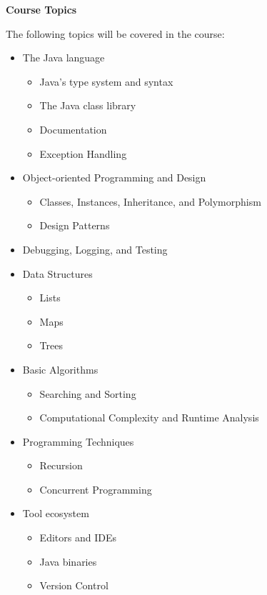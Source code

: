 \documentclass[12pt]{article}
\begin{document}
\pagebreak
{\large \noindent \textbf{Course Topics} }

\noindent The following topics will be covered in the course:

\begin{itemize}
\item The Java language
  \begin{itemize}
  \item Java's type system and syntax
  \item The Java class library
  \item Documentation
  \item Exception Handling
  \end{itemize}
\item Object-oriented Programming and Design
  \begin{itemize}
  \item Classes, Instances, Inheritance, and Polymorphism
  \item Design Patterns
  \end{itemize}
\item Debugging, Logging, and Testing
\item Data Structures
  \begin{itemize}
  \item Lists
  \item Maps
  \item Trees
  \end{itemize}
\item Basic Algorithms
  \begin{itemize}
  \item Searching and Sorting
  \item Computational Complexity and Runtime Analysis
  \end{itemize}
\item Programming Techniques
  \begin{itemize}
  \item Recursion
  \item Concurrent Programming
  \end{itemize}
\item Tool ecosystem
  \begin{itemize}
  \item Editors and IDEs
  \item Java binaries
  \item Version Control
  \end{itemize}
\end{itemize}
\end{document}
